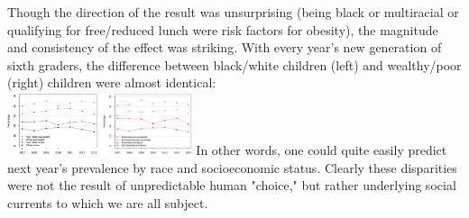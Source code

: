 \begin{multicols}{2}
Though the direction of the result was unsurprising (being black or multiracial or qualifying for free/reduced lunch were risk factors for obesity), the magnitude and consistency of the effect was striking.  With every year's new generation of sixth graders, the difference between black/white children (left) and wealthy/poor (right) children were almost identical:\\
\includegraphics[height=70, width=100]{alachua2.png}
\includegraphics[height=70, width=100]{alachua4.png}
In other words, one could quite easily predict next year's prevalence by race and socioeconomic status.  Clearly these disparities were not the result of unpredictable human "choice," but rather underlying social currents to which we are all subject.


\end{multicols}
